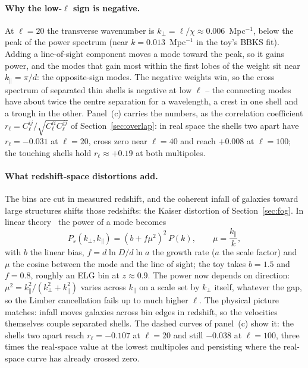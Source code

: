 \documentclass[11pt]{article}
\begin{document}
\paragraph{Why the low-$\ell$ sign is negative.}
At $\ell = 20$ the transverse wavenumber is $k_\perp = \ell/\chi
\approx 0.006$~Mpc$^{-1}$, below the peak of the power spectrum
(near $k = 0.013$~Mpc$^{-1}$ in the toy's BBKS fit).  Adding a
line-of-sight component moves a mode toward the peak, so it gains
power, and the modes that gain most within the first lobes of the
weight sit near $k_\parallel = \pi/d$: the opposite-sign modes.
The negative weights win, so the cross spectrum of separated thin
shells is negative at low $\ell$ -- the connecting modes have about
twice the centre separation for a wavelength, a crest in one shell
and a trough in the other.  Panel~(c) carries the numbers, as the
correlation coefficient $r_\ell = C^{ij}_\ell/\sqrt{C^{ii}_\ell
C^{jj}_\ell}$ of Section~\ref{sec:overlap}: in real space the
shells two apart have $r_\ell = -0.031$ at $\ell = 20$, cross zero
near $\ell = 40$ and reach $+0.008$ at $\ell = 100$; the touching
shells hold $r_\ell \approx +0.19$ at both multipoles.

\paragraph{What redshift-space distortions add.}
The bins are cut in measured redshift, and the coherent infall of
galaxies toward large structures shifts those redshifts: the Kaiser
distortion of Section~\ref{sec:fog}.  In linear
theory~\cite{Kaiser1987} the power of a mode becomes
\begin{equation}
  P_s(k_\perp, k_\parallel) = (b + f\mu^2)^2\, P(k),
  \qquad
  \mu = \frac{k_\parallel}{k},
  \label{eq:kaiser}
\end{equation}
with $b$ the linear bias, $f = d\ln D/d\ln a$ the growth rate ($a$
the scale factor) and $\mu$ the cosine between the mode and the
line of sight; the toy takes $b = 1.5$ and $f = 0.8$, roughly an
ELG bin at $z \approx 0.9$.  The power now depends on direction:
$\mu^2 = k_\parallel^2/(k_\perp^2 + k_\parallel^2)$ varies across
$k_\parallel$ on a scale set by $k_\perp$ itself, whatever the gap,
so the Limber cancellation fails up to much higher $\ell$.  The
physical picture matches: infall moves galaxies across bin edges in
redshift, so the velocities themselves couple separated shells.
The dashed curves of panel~(c) show it: the shells two apart reach
$r_\ell = -0.107$ at $\ell = 20$ and still $-0.038$ at
$\ell = 100$, three times the real-space value at the lowest
multipoles and persisting where the real-space curve has already
crossed zero.
\end{document}
